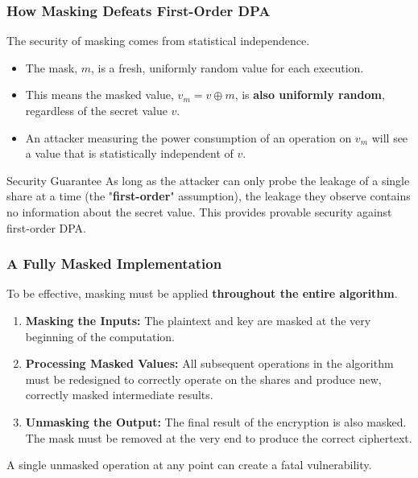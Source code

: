 \begin{frame}
    \frametitle{How Masking Defeats First-Order DPA}

    The security of masking comes from statistical independence.

    \begin{itemize}
        \item The mask, $m$, is a fresh, uniformly random value for each execution.
        \item This means the masked value, $v_m = v \oplus m$, is \textbf{also uniformly random}, regardless of the secret value $v$.
        \item An attacker measuring the power consumption of an operation on $v_m$ will see a value that is statistically independent of $v$.
    \end{itemize}

    \begin{alertblock}{Security Guarantee}
        As long as the attacker can only probe the leakage of a single share at a time (the "\textbf{first-order}" assumption), the leakage they observe contains no information about the secret value. This provides provable security against first-order DPA.
    \end{alertblock}

\end{frame}

\begin{frame}
    \frametitle{A Fully Masked Implementation}

    To be effective, masking must be applied \textbf{throughout the entire algorithm}.
    
    \begin{enumerate}
        \item \textbf{Masking the Inputs:} The plaintext and key are masked at the very beginning of the computation.
        
        \item \textbf{Processing Masked Values:} All subsequent operations in the algorithm must be redesigned to correctly operate on the shares and produce new, correctly masked intermediate results.
        
        \item \textbf{Unmasking the Output:} The final result of the encryption is also masked. The mask must be removed at the very end to produce the correct ciphertext.
    \end{enumerate}
    
    A single unmasked operation at any point can create a fatal vulnerability.
    
\end{frame}

